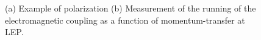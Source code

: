 \begin{figure}
  \centering
  \quad
  \caption{(a) Example of polarization (b) Measurement of the running of the electromagnetic coupling as a function of momentum-transfer at LEP\cite{achard2005}.}
\end{figure}
